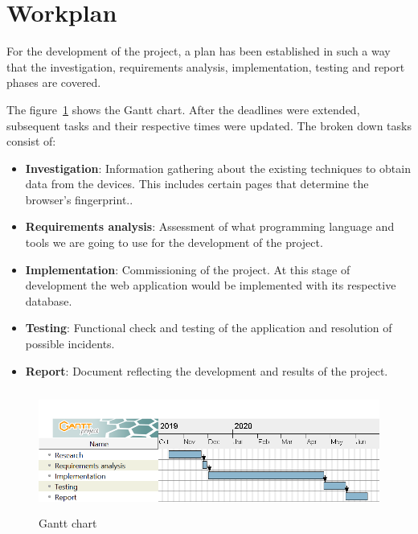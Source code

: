 \section{Workplan}
For the development of the project, a plan has been established in such a way that the investigation, requirements analysis, implementation, testing and report phases are covered. \par
The figure~\ref{fig:diagramaGantten} shows the Gantt chart. After the deadlines were extended, subsequent tasks and their respective times were updated. The broken down tasks consist of:
\begin{itemize}
    \item \textbf{Investigation}: Information gathering about the existing techniques\cite{Huella} to obtain data from the devices. This includes certain pages that determine the browser's fingerprint.\cite{amiunique}.
    \item \textbf{Requirements analysis}: Assessment of what programming language and tools we are going to use for the development of the project.
    \item \textbf{Implementation}: Commissioning of the project. At this stage of development the web application would be implemented with its respective database.
    \item \textbf{Testing}: Functional check and testing of the application and resolution of possible incidents.
    \item \textbf{Report}: Document reflecting the development and results of the project.
\end{itemize}
\begin{figure}[b]
    \includegraphics[width=1\textwidth, height=4cm]{Images/diagramaGantten.png}
    \caption{Gantt chart}
    \label{fig:diagramaGantten}
\end{figure}

